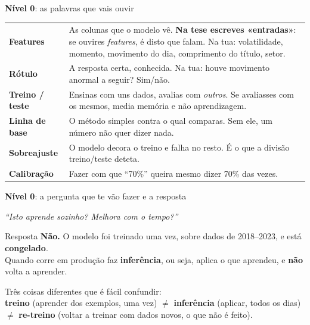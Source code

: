 \documentclass[aspectratio=169]{beamer}
\newcommand{\key}[1]{\textbf{\textcolor{blue!55!black}{#1}}}
\begin{document}
\begin{frame}{\key{Nível 0}: as palavras que vais ouvir}
\small
\begin{tabular}{p{} p{}}
\toprule
\key{Features} & As colunas que o modelo vê. \textbf{Na tese escreves «entradas»}: se ouvires
\emph{features}, é disto que falam. Na tua: volatilidade, momento, movimento do dia,
comprimento do título, setor. \\
\key{Rótulo} & A resposta certa, conhecida. Na tua: houve movimento anormal a seguir? Sim/não. \\
\key{Treino / teste} & Ensinas com uns dados, avalias com \emph{outros}. Se avaliasses com os
mesmos, media memória e não aprendizagem. \\
\key{Linha de base} & O método simples contra o qual comparas. Sem ele, um número não quer dizer
nada. \\
\key{Sobreajuste} & O modelo decora o treino e falha no resto. É o que a divisão treino/teste
deteta. \\
\key{Calibração} & Fazer com que ``70\%'' queira mesmo dizer 70\% das vezes. \\
\bottomrule
\end{tabular}
\end{frame}

\begin{frame}{\key{Nível 0}: a pergunta que te vão fazer e a resposta}
\begin{center}
\emph{``Isto aprende sozinho? Melhora com o tempo?''}
\end{center}
\vspace{4mm}
\begin{block}{Resposta}
\textbf{Não.} O modelo foi treinado uma vez, sobre dados de 2018--2023, e está \key{congelado}.\\
Quando corre em produção faz \key{inferência}, ou seja, aplica o que aprendeu, e \textbf{não} volta a
aprender.
\end{block}
\vspace{3mm}
\footnotesize
Três coisas diferentes que é fácil confundir:\\
\key{treino} (aprender dos exemplos, uma vez) $\neq$
\key{inferência} (aplicar, todos os dias) $\neq$
\key{re-treino} (voltar a treinar com dados novos, o que não é feito).
\end{frame}
\end{document}
